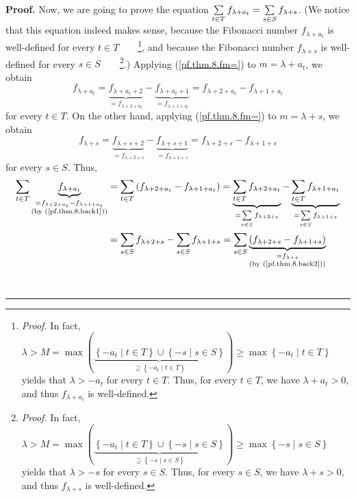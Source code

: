 \documentclass[numbers=enddot,12pt,final,onecolumn,notitlepage]{scrartcl}%
\numberwithin{exer}{section}
\theoremstyle{definition}
\newenvironment{proof}[1][Proof]{\noindent\textbf{#1.} }{\ \rule{0.5em}{0.5em}}
\let\sumnonlimits\sum
\renewcommand{\sum}{\sumnonlimits\limits}
\begin{document}
\begin{proof}
Now, we are going to prove the equation $\sum\limits_{t\in T}f_{\lambda+a_{t}%
}=\sum\limits_{s\in S}f_{\lambda+s}$. (We notice that this equation indeed
makes sense, because the Fibonacci number $f_{\lambda+a_{t}}$ is well-defined
for every $t\in T$\ \ \ \ \footnote{\textit{Proof.} In fact, $\lambda
>M=\max\left(  \underbrace{\left\{  -a_{t}\mid t\in T\right\}  \cup\left\{
-s\mid s\in S\right\}  }_{\supseteq\left\{  -a_{t}\mid t\in T\right\}
}\right)  \geq\max\left\{  -a_{t}\mid t\in T\right\}  $ yields that
$\lambda>-a_{t}$ for every $t\in T$. Thus, for every $t\in T$, we have
$\lambda+a_{t}>0$, and thus $f_{\lambda+a_{t}}$ is well-defined.}, and because
the Fibonacci number $f_{\lambda+s}$ is well-defined for every $s\in
S$\ \ \ \ \footnote{\textit{Proof.} In fact, $\lambda>M=\max\left(
\underbrace{\left\{  -a_{t}\mid t\in T\right\}  \cup\left\{  -s\mid s\in
S\right\}  }_{\supseteq\left\{  -s\mid s\in S\right\}  }\right)  \geq
\max\left\{  -s\mid s\in S\right\}  $ yields that $\lambda>-s$ for every $s\in
S$. Thus, for every $s\in S$, we have $\lambda+s>0$, and thus $f_{\lambda+s}$
is well-defined.}.) Applying (\ref{pf.thm.8.fm=}) to $m=\lambda+a_{t}$, we
obtain
\begin{equation}
f_{\lambda+a_{t}}=\underbrace{f_{\lambda+a_{t}+2}}_{=f_{\lambda+2+a_{t}}%
}-\underbrace{f_{\lambda+a_{t}+1}}_{=f_{\lambda+1+a_{t}}}=f_{\lambda+2+a_{t}%
}-f_{\lambda+1+a_{t}} \label{pf.thm.8.back1}%
\end{equation}
for every $t\in T$. On the other hand, applying (\ref{pf.thm.8.fm=}) to
$m=\lambda+s$, we obtain%
\begin{equation}
f_{\lambda+s}=\underbrace{f_{\lambda+s+2}}_{=f_{\lambda+2+s}}%
-\underbrace{f_{\lambda+s+1}}_{=f_{\lambda+1+s}}=f_{\lambda+2+s}%
-f_{\lambda+1+s} \label{pf.thm.8.back2}%
\end{equation}
for every $s\in S$. Thus,%
\begin{align*}
\sum\limits_{t\in T}\underbrace{f_{\lambda+a_{t}}}_{\substack{=f_{\lambda
+2+a_{t}}-f_{\lambda+1+a_{t}}\\\text{(by (\ref{pf.thm.8.back1}))}}}  &
=\sum\limits_{t\in T}\left(  f_{\lambda+2+a_{t}}-f_{\lambda+1+a_{t}}\right)
=\underbrace{\sum\limits_{t\in T}f_{\lambda+2+a_{t}}}_{=\sum\limits_{s\in
S}f_{\lambda+2+s}}-\underbrace{\sum\limits_{t\in T}f_{\lambda+1+a_{t}}}%
_{=\sum\limits_{s\in S}f_{\lambda+1+s}}\\
&  =\sum\limits_{s\in S}f_{\lambda+2+s}-\sum\limits_{s\in S}f_{\lambda
+1+s}=\sum\limits_{s\in S}\underbrace{\left(  f_{\lambda+2+s}-f_{\lambda
+1+s}\right)  }_{\substack{=f_{\lambda+s}\\\text{(by (\ref{pf.thm.8.back2}))}%
}}
\end{align*}
\end{proof}
\end{document}
